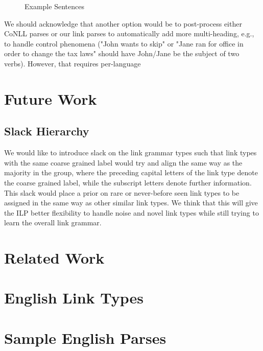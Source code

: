 \documentclass[11pt]{article}
\begin{document}
\begin{figure}[ht!]
  \centering
  
  \caption{Example Sentences}
\end{figure}


We should acknowledge that another option would be to post-process either CoNLL parses or our link parses to automatically add more multi-heading, e.g., to handle control phenomena ("John wants to skip" or "Jane ran for office in order to change the tax laws" should have John/Jane be the subject of two verbs).  However, that requires per-language 



\section{Future Work}

\subsection{Slack Hierarchy}
We would like to introduce slack on the link grammar types such that link types with the same coarse grained label would try and align the same way as the majority in the group, where the preceding capital letters of the link type denote the coarse grained label, while the subscript letters denote further information. This slack would place a prior on rare or never-before seen link types to be assigned in the same way as other similar link types. We think that this will give the ILP better flexibility to handle noise and novel link types while still trying to learn the overall link grammar.





\section{Related Work}










\clearpage
\appendix
\section{English Link Types}


\section{Sample English Parses}

\end{document}
